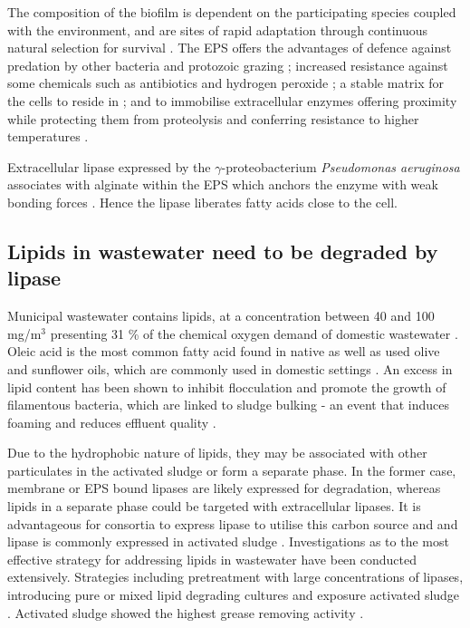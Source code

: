 \documentclass[11pt]{article}
\begin{document}
The composition of the biofilm is dependent on the participating species coupled with the environment, and are sites of rapid adaptation through continuous natural selection for survival \cite{boles2008,matz2005,palmer2001}.  
The EPS offers the advantages of defence against predation by other bacteria \cite{rao2005} and protozoic grazing \cite{matz2005}; increased resistance against some chemicals such as antibiotics and hydrogen peroxide \cite{burmolle_06}; a stable matrix for the cells to reside in \cite{Flemming_10}; and to immobilise extracellular enzymes offering proximity while protecting them from proteolysis and conferring resistance to higher temperatures \cite{wingender2002extracellular,Flemming_10,skillman1998}.

Extracellular lipase expressed by the \emph{$\gamma$}-proteobacterium \textit{Pseudomonas aeruginosa} associates with alginate within the EPS which anchors the enzyme with weak bonding forces \cite{mayer1999role,wicker1987}. Hence the lipase  liberates fatty acids close to the cell.

\subsection{Lipids in wastewater need to be degraded by lipase}
Municipal wastewater contains lipids, at a concentration between 40 and 100 mg/m$^{3}$ \cite{Forster_92} presenting 31 \% of the chemical oxygen demand of domestic wastewater \cite{Raunkjaer_94}. Oleic acid is the most common fatty acid found in native as well as used olive and sunflower oils, which are commonly used in domestic settings \cite{haba2000isolation}.  An excess in lipid content has been shown to inhibit flocculation and promote the growth of filamentous bacteria, which are linked to sludge bulking - an event that induces foaming and reduces effluent quality \cite{Forster_92}.


Due to the hydrophobic nature of lipids, they may be associated with other particulates in the activated sludge or form a separate phase. In the former case, membrane or EPS bound lipases are likely expressed for degradation, whereas lipids in a separate phase could be targeted with extracellular lipases. It is advantageous for consortia to express lipase to utilise this carbon source and and lipase is commonly expressed in activated sludge \cite{gessesse2003lipase}. Investigations as to the most effective strategy for addressing lipids in wastewater have been conducted extensively. Strategies including pretreatment with large concentrations of lipases, introducing pure or mixed lipid degrading cultures and exposure activated sludge \cite{Wakelin_97}. Activated sludge showed the highest grease removing activity \cite{Wakelin_97}. 
\end{document}
